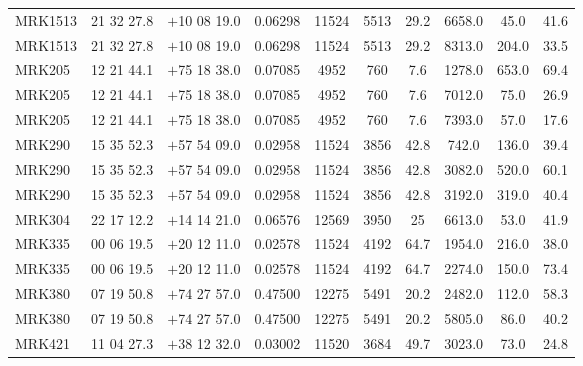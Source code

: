 \begin{landscape}
\begin{center}
\begin{longtable}{l c c c c c c c c c}
MRK1513  &                 21 32 27.8  &         $+$10 08 19.0  &       0.06298  & 11524  &   5513  &       29.2  &      6658.0  &  45.0  &   41.6  \\
MRK1513  &                 21 32 27.8  &         $+$10 08 19.0  &       0.06298  & 11524  &   5513  &       29.2  &      8313.0  &  204.0  &  33.5  \\
MRK205  &                  12 21 44.1  &         $+$75 18 38.0  &       0.07085  & 4952  &    760  &        7.6  &       1278.0  &  653.0  &  69.4  \\
MRK205  &                  12 21 44.1  &         $+$75 18 38.0  &       0.07085  & 4952  &    760  &        7.6  &       7012.0  &  75.0  &   26.9  \\
MRK205  &                  12 21 44.1  &         $+$75 18 38.0  &       0.07085  & 4952  &    760  &        7.6  &       7393.0  &  57.0  &   17.6  \\
MRK290  &                  15 35 52.3  &         $+$57 54 09.0  &       0.02958  & 11524  &   3856  &       42.8  &      742.0  &   136.0  &  39.4  \\
MRK290  &                  15 35 52.3  &         $+$57 54 09.0  &       0.02958  & 11524  &   3856  &       42.8  &      3082.0  &  520.0  &  60.1  \\
MRK290  &                  15 35 52.3  &         $+$57 54 09.0  &       0.02958  & 11524  &   3856  &       42.8  &      3192.0  &  319.0  &  40.4  \\
MRK304  &                  22 17 12.2  &         $+$14 14 21.0  &       0.06576  & 12569  &   3950  &       25  &        6613.0  &  53.0  &   41.9  \\
MRK335  &                  00 06 19.5  &         $+$20 12 11.0  &       0.02578  & 11524  &   4192  &       64.7  &      1954.0  &  216.0  &  38.0  \\
MRK335  &                  00 06 19.5  &         $+$20 12 11.0  &       0.02578  & 11524  &   4192  &       64.7  &      2274.0  &  150.0  &  73.4  \\
MRK380  &                  07 19 50.8  &         $+$74 27 57.0  &       0.47500  & 12275  &   5491  &       20.2  &      2482.0  &  112.0  &  58.3  \\
MRK380  &                  07 19 50.8  &         $+$74 27 57.0  &       0.47500  & 12275  &   5491  &       20.2  &      5805.0  &  86.0  &   40.2  \\
MRK421  &                  11 04 27.3  &         $+$38 12 32.0  &       0.03002  & 11520  &   3684  &       49.7  &      3023.0  &  73.0  &   24.8  \\

\end{longtable}
\end{center}
\end{landscape}
